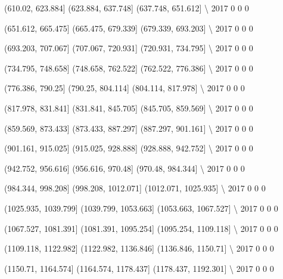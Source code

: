 \documentclass[11pt]{article}
\begin{document}
      (610.02, 623.884]  (623.884, 637.748]  (637.748, 651.612]  \textbackslash{}
2017                  0                   0                   0   

      (651.612, 665.475]  (665.475, 679.339]  (679.339, 693.203]  \textbackslash{}
2017                   0                   0                   0   

      (693.203, 707.067]  (707.067, 720.931]  (720.931, 734.795]  \textbackslash{}
2017                   0                   0                   0   

      (734.795, 748.658]  (748.658, 762.522]  (762.522, 776.386]  \textbackslash{}
2017                   0                   0                   0   

      (776.386, 790.25]  (790.25, 804.114]  (804.114, 817.978]  \textbackslash{}
2017                  0                  0                   0   

      (817.978, 831.841]  (831.841, 845.705]  (845.705, 859.569]  \textbackslash{}
2017                   0                   0                   0   

      (859.569, 873.433]  (873.433, 887.297]  (887.297, 901.161]  \textbackslash{}
2017                   0                   0                   0   

      (901.161, 915.025]  (915.025, 928.888]  (928.888, 942.752]  \textbackslash{}
2017                   0                   0                   0   

      (942.752, 956.616]  (956.616, 970.48]  (970.48, 984.344]  \textbackslash{}
2017                   0                  0                  0   

      (984.344, 998.208]  (998.208, 1012.071]  (1012.071, 1025.935]  \textbackslash{}
2017                   0                    0                     0   

      (1025.935, 1039.799]  (1039.799, 1053.663]  (1053.663, 1067.527]  \textbackslash{}
2017                     0                     0                     0   

      (1067.527, 1081.391]  (1081.391, 1095.254]  (1095.254, 1109.118]  \textbackslash{}
2017                     0                     0                     0   

      (1109.118, 1122.982]  (1122.982, 1136.846]  (1136.846, 1150.71]  \textbackslash{}
2017                     0                     0                    0   

      (1150.71, 1164.574]  (1164.574, 1178.437]  (1178.437, 1192.301]  \textbackslash{}
2017                    0                     0                     0   
\end{document}
